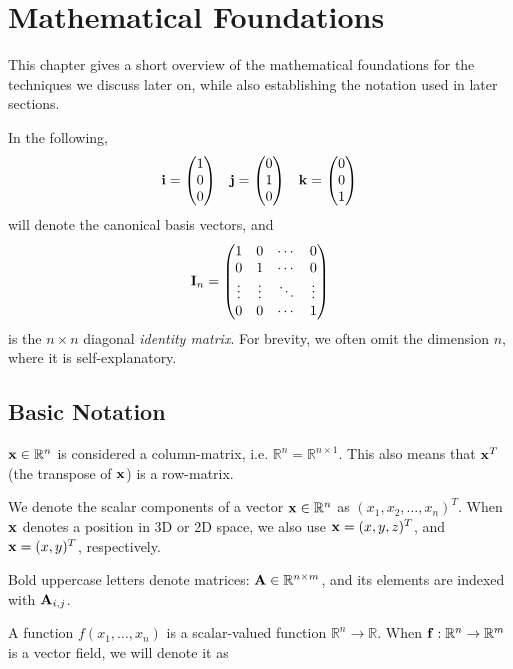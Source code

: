 \chapter{Mathematical Foundations}
\label{sec:mathematicalFoundations}
This chapter gives a short overview of the mathematical foundations for the
techniques we discuss later on, while also establishing the notation used in
later sections.

In the following,
\begin{equation*}
    \vb{i} = \mqty( 1 \\ 0 \\ 0 )\quad
    \vb{j} = \mqty( 0 \\ 1 \\ 0 )\quad
    \vb{k} = \mqty( 0 \\ 0 \\ 1 )
\end{equation*}
will denote the canonical basis vectors, and
\begin{equation*}
    \vb{I}_n =
    \begin{pmatrix}
        1 & 0 & \cdots & 0 \\
        0 & 1 & \cdots & 0 \\
        \vdots & \vdots & \ddots & \vdots \\
        0 & 0 & \cdots & 1
    \end{pmatrix}
\end{equation*}
is the $n\times n$ diagonal \textit{identity matrix}. For brevity, we often omit
the dimension $n$, where it is self-explanatory.

\section{Basic Notation}
$\vb{x} \in \mathbb{R}^n$ is considered a column-matrix, i.e. $\mathbb{R}^n
= \mathbb{R}^{n \times 1}$. This also means that $\vb{x}^T$ (the transpose of
$\vb{x}$) is a row-matrix.

We denote the scalar components of a vector $\vb{x}\in \mathbb{R}^{n}$ as $(x_1,
x_2, \dots, x_n)^T$. When $\vb{x}$ denotes a position in 3D or 2D space, we also
use $\vb{x} = (x,y,z)^T$, and $\vb{x} = (x,y)^T$, respectively.

Bold uppercase letters denote matrices: $\vb{A}\in \mathbb{R}^{n \times m}$, and
its elements are indexed with $\vb{A}_{i,j}$.

A function $f(x_1, \dots, x_n)$ is a scalar-valued function $\mathbb{R}^n \to
\mathbb{R}$.  When $\vb{f}: \mathbb{R}^n \to \mathbb{R}^m$ is a vector field, we
will denote it as 

